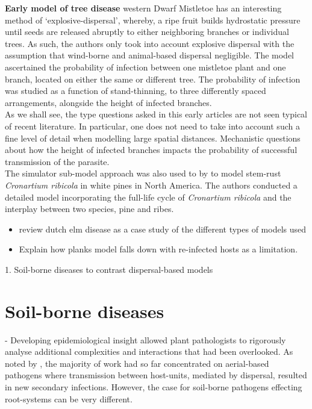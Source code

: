     \textbf{Early model of tree disease} western Dwarf Mistletoe has an interesting method of `explosive-dispersal', whereby, a ripe fruit builds hydrostatic pressure until seeds are released abruptly to either neighboring branches or individual trees. As such, the authors only took into account explosive dispersal with the assumption that wind-borne and animal-based dispersal negligible. The model ascertained the probability of infection between one mistletoe plant and one branch, located on either the same or different tree. The probability of infection was studied as a function of stand-thinning, to three differently spaced arrangements, alongside the height of infected branches.\\
     
     As we shall see, the type questions asked in this early articles are not seen typical of recent literature. In particular, one does not need to take into account such a fine level of detail when modelling large spatial distances. Mechanistic questions about how the height of infected branches impacts the probability of successful transmission of the parasite.\\
     
     The simulator sub-model approach was also used to by \cite{mcdonald1981computer} to model stem-rust \textit{Cronartium ribicola} in white pines in North America. The authors conducted a detailed model incorporating the full-life cycle of \textit{Cronartium ribicola} and the interplay between two species, pine and ribes.\\
     
    \begin{itemize}
        \item  review dutch elm disease as a case study of the different types of models used \cite{doi:10.1098/rstb.1996.0059}
        \item Explain how planks model falls down with re-infected hosts as a limitation.
    \end{itemize}




1. Soil-borne diseases to contrast dispersal-based models
    \section{Soil-borne diseases}
    
    - Developing epidemiological insight allowed plant pathologists to rigorously analyse additional complexities and interactions that had been overlooked. As noted by \cite{doi:10.1146/annurev.py.21.090183.000401}, the majority of work had so far concentrated on aerial-based pathogens where transmission between host-units, mediated by dispersal, resulted in new secondary infections. However, the case for soil-borne pathogens effecting root-systems can be very different. 
    
